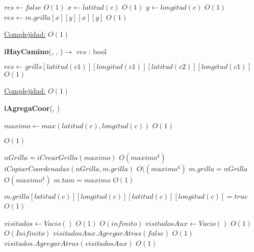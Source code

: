 \begin{Algoritmos}
\begin{algorithm}[H]
\begin{algorithmic}[1]
	\State $res \gets false$ \Comment $O(1)$
\Else
	\State $x \gets latitud(c)$ \Comment $O(1)$
	\State $y \gets longitud(c)$ \Comment $O(1)$
	\State $res \gets m.grilla[x][y][x][y]$ \Comment $O(1)$
\EndIf


\medskip
\Statex \underline{Complejidad:} $O(1)$


\end{algorithmic}
\end{algorithm}


\begin{algorithm}[H]
{\textbf{iHayCamino}(, , )$\to$ $res$ : bool}
\begin{algorithmic}[1]

\State $res \gets grills[latitud(c1)][longitud(c1)][latitud(c2)][longitud(c1)]$ \Comment $O(1)$

\medskip
\Statex \underline{Complejidad:} $O(1)$


\end{algorithmic}
\end{algorithm}




{\textbf{iAgregaCoor}(, )}
\begin{algorithmic}[1]

\State $maximo \gets max(latitud(c), longitud(c)) $ \Comment $O(1)$

\State {} \Comment $O(1)$

\State $nGrilla = iCrearGrilla(maximo)$ \Comment $O(maximo^4)$
\State $iCopiarCoordenadas(nGrilla, m.grilla)$ \Comment $O((maximo^4)$
\State $m.grilla = nGrilla$ \Comment $O(maximo^4)$
\State $m.tam = maximo$ \Comment $O(1)$

\EndIf

\State $m.grilla[latitud(c)][longitud(c)][latitud(c)][longitud(c)] = true$ \Comment $O(1)$
\State $ $

\State $visitados \gets Vacio() $ \Comment $O(1)$
	    \Comment $O(infinito)$
\State $visitadosAux \gets Vacio() $ \Comment $O(1)$	
      \Comment $O(Inifinito)$
\State $visitadosAux.AgregarAtras(false)$ \Comment $O(1)$
\EndFor
\State $visitados.AgregarAtras(visitadosAux)$ \Comment $O(1)$
\EndFor



\end{algorithmic}
\end{Algoritmos}
